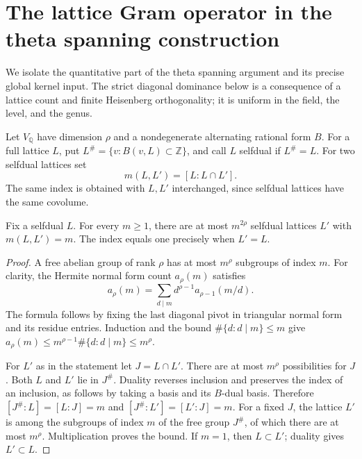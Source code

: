 \section{The lattice Gram operator in the theta spanning construction}
\label{sec:sr-theta-gram}

We isolate the quantitative part of the theta spanning argument and
its precise global kernel input.  The strict diagonal dominance below
is a consequence of a lattice count and finite Heisenberg
orthogonality; it is uniform in the field, the level, and the genus.

Let \(V_\mathbb Q\) have dimension \(\rho\) and a nondegenerate
alternating rational form \(B\).  For a full lattice \(L\), put
\(L^\#=\{v:B(v,L)\subset\mathbb Z\}\), and call \(L\) selfdual if
\(L^\#=L\).  For two selfdual lattices set
\[
 m(L,L')=[L:L\cap L'].
\]
The same index is obtained with \(L,L'\) interchanged, since
selfdual lattices have the same covolume.

\begin{srlemma}
\label{lem:sr-selfdual-count}
Fix a selfdual \(L\).  For every \(m\ge1\), there are at most
\(m^{2\rho}\) selfdual lattices \(L'\) with \(m(L,L')=m\).
The index equals one precisely when \(L'=L\).
\end{srlemma}

\begin{proof}
A free abelian group of rank \(\rho\) has at most \(m^\rho\)
subgroups of index \(m\).  For clarity, the Hermite normal form
count \(a_\rho(m)\) satisfies
\[
 a_\rho(m)=\sum_{d\mid m}d^{\rho-1}a_{\rho-1}(m/d).
\]
The formula follows by fixing the last diagonal pivot in triangular
normal form and its residue entries.  Induction and the bound
\(\#\{d:d\mid m\}\le m\) give
\(a_\rho(m)\le m^{\rho-1}\#\{d:d\mid m\}\le m^\rho\).

For \(L'\) as in the statement let \(J=L\cap L'\).
There are at most \(m^\rho\) possibilities for \(J\).
Both \(L\) and \(L'\) lie in \(J^\#\).
Duality reverses inclusion and preserves the index of an inclusion,
as follows by taking a basis and its \(B\)-dual basis.
Therefore
\([J^\#:L]=[L:J]=m\) and
\([J^\#:L']=[L':J]=m\).
For a fixed \(J\), the lattice \(L'\) is among the subgroups of index
\(m\) of the free group \(J^\#\), of which there are at most
\(m^\rho\).  Multiplication proves the bound.
If \(m=1\), then \(L\subset L'\); duality gives \(L'\subset L\).
\end{proof}

